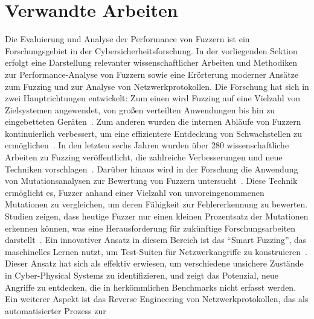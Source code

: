 
\section{Verwandte Arbeiten}\label{sec:related-work}
Die Evaluierung und Analyse der Performance von Fuzzern ist ein Forschungsgebiet in der Cybersicherheitsforschung.
In der vorliegenden Sektion erfolgt eine Darstellung relevanter wissenschaftlicher Arbeiten und Methodiken zur Performance-Analyse
von Fuzzern sowie eine Erörterung moderner Ansätze zum Fuzzing und zur Analyse von Netzwerkprotokollen.\newline\newline
Die Forschung hat sich in zwei Hauptrichtungen entwickelt: Zum einen wird Fuzzing auf eine Vielzahl von Zielsystemen angewendet,
von großen verteilten Anwendungen bis hin zu eingebetteten Geräten~\cite{iot-fuzzing,fuzzing-assessment,embedded-fuzzing,iot-fuzzer,libafl}.
Zum anderen wurden die internen Abläufe von Fuzzern kontinuierlich verbessert, um eine effizientere Entdeckung von Schwachstellen
zu ermöglichen~\cite{fuzzing-evaluation,a-survey-of-network-protocol-fuzzing,AFLplusplus-Woot20, mutuation-analysis}.
In den letzten sechs Jahren wurden über 280 wissenschaftliche Arbeiten zu Fuzzing veröffentlicht, die zahlreiche Verbesserungen
und neue Techniken vorschlagen~\cite{fuzzing-evaluation}.\newline
Darüber hinaus wird in der Forschung die Anwendung von Mutationsanalysen zur Bewertung von Fuzzern untersucht~\cite{mutuation-analysis}.
Diese Technik ermöglicht es, Fuzzer anhand einer Vielzahl von unvoreingenommenen Mutationen zu vergleichen, um deren Fähigkeit
zur Fehlererkennung zu bewerten.
Studien zeigen, dass heutige Fuzzer nur einen kleinen Prozentsatz der Mutationen erkennen können, was eine Herausforderung
für zukünftige Forschungsarbeiten darstellt~\cite{mutuation-analysis}.\newline
Ein innovativer Ansatz in diesem Bereich ist das \enquote{Smart Fuzzing}, das maschinelles Lernen nutzt, um Test-Suiten für
Netzwerkangriffe zu konstruieren~\cite{smart-fuzzing,pulsar,cnn}.
Dieser Ansatz hat sich als effektiv erwiesen, um verschiedene unsichere Zustände in Cyber-Physical Systems zu identifizieren,
und zeigt das Potenzial, neue Angriffe zu entdecken, die in herkömmlichen Benchmarks nicht erfasst werden.\newline
Ein weiterer Aspekt ist das Reverse Engineering von Netzwerkprotokollen, das als automatisierter Prozess zur
